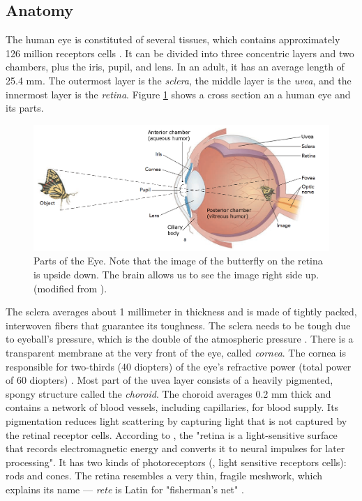 
\subsection{Anatomy}
\label{subsec:Anatomy}

The human eye is constituted of several tissues, which contains approximately 126 million receptors cells \cite{King2012}. It can be divided into three concentric layers and two chambers, plus the iris, pupil, and lens. In an adult, it has an average length of 25.4 mm. The outermost layer is the {\it sclera}, the middle layer is the {\it uvea}, and the innermost layer is the {\it retina}. Figure \ref{fig:cross_section} shows a cross section an a human eye and its parts.

\begin{figure}[!t]

	\centering
	\includegraphics[width=1.00\linewidth]{__Images/02/new-eye.png}
	\caption[Parts of the Eye]{Parts of the Eye. Note that the image of the butterfly on the retina is upside down. The brain allows us to see the image right side up. (modified from \citet{King2012}).}
	\label{fig:cross_section}
\end{figure}

The sclera averages about 1 millimeter in thickness and is made of tightly packed, interwoven fibers that guarantee its toughness. The sclera needs to be tough due to eyeball's pressure, which is the double of the atmospheric pressure \cite{Blake2005}. There is a transparent membrane at the very front of the eye, called {\it cornea}. The cornea is responsible for two-thirds (40 diopters) of the eye's refractive power (total power of 60 diopters) \cite{Tkaczyk2010}. Most part of the uvea layer consists of a heavily pigmented, spongy structure called the {\it choroid}. The choroid averages 0.2 mm thick and contains a network of blood vessels, including capillaries, for blood supply. Its pigmentation reduces light scattering by capturing light that is not captured by the retinal receptor cells. According to \citet{King2012}, the "retina is a light-sensitive surface that records electromagnetic energy and converts it to neural impulses for later processing". It has two kinds of photoreceptors (\ie, light sensitive receptors cells): rods and cones. The retina resembles a very thin, fragile meshwork, which explains its name --- \emph{rete} is Latin for "fisherman's net" \cite{Blake2005}.

